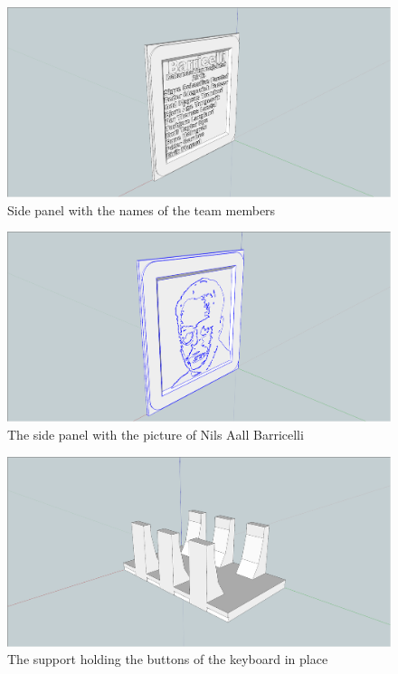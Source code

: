 \newpage
\begin{figure}
\includegraphics[width=\textwidth,keepaspectratio,clip]{appendix/screen-shots/names-side-panel.png}%
\caption{Side panel with the names of the team members}
\end{figure}
\newpage
\begin{figure}
\includegraphics[width=\textwidth,keepaspectratio,clip]{appendix/screen-shots/barricelli-panel.png}%
\caption{The side panel with the picture of Nils Aall Barricelli}
\end{figure}
\newpage
\begin{figure}
\includegraphics[width=\textwidth,keepaspectratio,clip]{appendix/screen-shots/keyboard-support.png}%
\caption{The support holding the buttons of the keyboard in place}
\end{figure}
